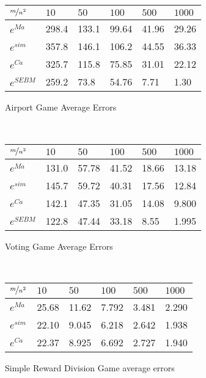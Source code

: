 \begin{table*}[h]
    \centering 
    \begin{subfigure}[]{0.8\textwidth}
        \centering
        \caption{Airport Game Average Errors}\label{tab1}
			\begin{tabular}{llllll}
			\hline
			$\nicefrac{m}{n^2}$ & $10$ & $50$ & $100$ & $500$ & $1000$ \\
			\hline
			$e^{Ma}$   & 298.4 & 133.1 & 99.64 & 41.96 & 29.26 \\
			$e^{sim}$  & 357.8 & 146.1 & 106.2 & 44.55 & 36.33 \\
			$e^{Ca}$   & 325.7 & 115.8 & 75.85 & 31.01 & 22.12 \\
			$e^{SEBM}$ & 259.2 & 73.8 & 54.76 & 7.71 & 1.30  \\
			\hline
			\end{tabular}
    \end{subfigure}
	\\\vspace{4mm}
    \begin{subfigure}[]{0.8\textwidth}
        \centering
        \caption{Voting Game Average Errors}\label{tab2}
			\begin{tabular}{llllll}
			\hline
			$\nicefrac{m}{n^2}$ & $10$ & $50$ & $100$ & $500$ & $1000$ \\
			\hline
			$e^{Ma}$    & 131.0 & 57.78 & 41.52 & 18.66 & 13.18 \\
			$e^{sim}$   & 145.7 & 59.72 & 40.31 & 17.56 & 12.84 \\
			$e^{Ca}$    & 142.1 & 47.35 & 31.05 & 14.08 & 9.800 \\
			$e^{SEBM}$  & 122.8 & 47.44 & 33.18 & 8.55 & 1.995  \\
			\hline
			\end{tabular}
    \end{subfigure}
	\\\vspace{4mm}
    \begin{subfigure}[]{0.8\textwidth}
        \centering
        \caption{Simple Reward Division Game average errors}\label{tab3}
			\begin{tabular}{llllll}
			\hline
			$\nicefrac{m}{n^2}$ & $10$ & $50$ & $100$ & $500$ & $1000$ \\
			\hline
			$e^{Ma}$    & 25.68 & 11.62 & 7.792 & 3.481 & 2.290 \\
			$e^{sim}$   & 22.10 & 9.045 & 6.218 & 2.642 & 1.938 \\
			$e^{Ca}$    & 22.37 & 8.925 & 6.692 & 2.727 & 1.940 \\

\end{tabular}
\end{subfigure}
\end{table*}
